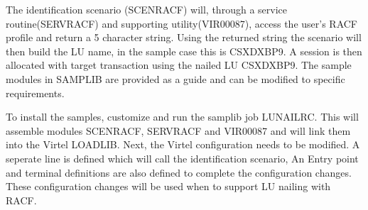\documentclass[letterpaper,10pt,english]{sphinxmanual}
\begin{document}
\begin{sphinxVerbatim}[commandchars=\\\{\}]
           

                   
             
      

                                           

  
         
\end{sphinxVerbatim}

\sphinxAtStartPar
The identification scenario (SCENRACF) will, through a service routine(SERVRACF) and supporting utility(VIR00087), access the user’s RACF profile and return a 5 character string. Using the returned string the scenario will then build the LU name, in the sample case this is CSXDXBP9. A session is then allocated with target transaction using the nailed LU CSXDXBP9. The sample modules in SAMPLIB are provided as a guide and can be modified to specific requirements.

\sphinxAtStartPar
To install the samples, customize and run the samplib job LUNAILRC. This will assemble modules SCENRACF, SERVRACF and VIR00087 and will link them into the Virtel LOADLIB. Next, the Virtel configuration needs to be modified. A seperate line is defined which will call the identification scenario, An Entry point and terminal definitions are also defined to complete the configuration changes. These configuration changes will be used when to support LU nailing with RACF.
\end{document}

